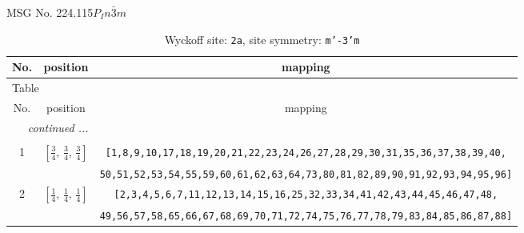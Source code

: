 \documentclass[fleqn,8pt]{jsarticle}
\begin{document}
\setcounter{MaxMatrixCols}{32}

\renewcommand{\tablename}{Table~}
\renewcommand{\figurename}{Figure~}
\begin{center}
\LARGE
MSG No. 224.115\quad$P_{I}n\bar{3}m$
\end{center}
\renewcommand{\arraystretch}{1.2}
\begin{longtable}{ccc}
\caption{Wyckoff site: {\tt 2a}, site symmetry: {\tt m'-3'm}}
 \\
 \hline \hline
No. & position & mapping \\ \hline \endfirsthead

\multicolumn{2}{l}{\tablename\ \thetable{}} \\
 \hline \hline
No. & position & mapping \\ \hline \endhead

 \hline \hline
\multicolumn{2}{r}{\footnotesize\it continued ...} \\ \endfoot

 \hline \hline
\multicolumn{2}{r}{} \\ \endlastfoot

1 & $\left[ \frac{3}{4},\, \frac{3}{4},\, \frac{3}{4} \right]$ & {\tt [1,8,9,10,17,18,19,20,21,22,23,24,26,27,28,29,30,31,35,36,37,38,39,40,} \\ \hline
 &  & {\tt 50,51,52,53,54,55,59,60,61,62,63,64,73,80,81,82,89,90,91,92,93,94,95,96]} \\ \hline
2 & $\left[ \frac{1}{4},\, \frac{1}{4},\, \frac{1}{4} \right]$ & {\tt [2,3,4,5,6,7,11,12,13,14,15,16,25,32,33,34,41,42,43,44,45,46,47,48,} \\ \hline
 &  & {\tt 49,56,57,58,65,66,67,68,69,70,71,72,74,75,76,77,78,79,83,84,85,86,87,88]} \\
\end{longtable}
\renewcommand{\arraystretch}{1.2}
\end{document}
